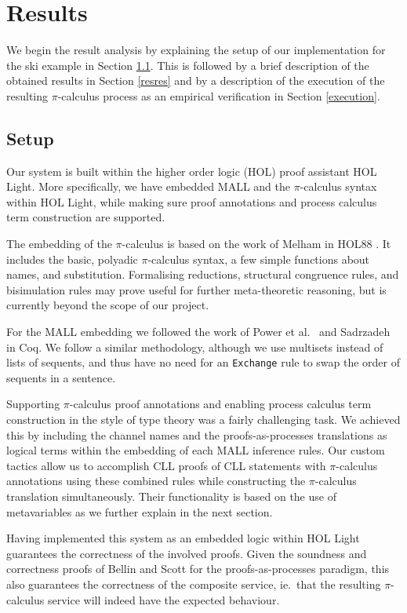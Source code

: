 \documentclass[copyright,creativecommons]{eptcs}
\begin{document}
\section{Results}
\label{results}

We begin the result analysis by explaining the setup of our implementation for the ski example in Section \ref{setup}. This is followed by a brief description of the obtained results in Section \ref{resres} and by a description of the execution of the resulting $\pi$-calculus process as an empirical verification in Section \ref{execution}.

\subsection{Setup}
\label{setup}

Our system is built within the higher order logic (HOL) proof assistant HOL Light. More specifically, we have embedded MALL and the $\pi$-calculus syntax within HOL Light, while making sure proof annotations and process calculus term construction are supported.

The embedding of the $\pi$-calculus is based on the work of Melham in HOL88 \cite{melham1994mechanized}. It includes the basic, polyadic $\pi$-calculus syntax, a few simple functions about names, and substitution. Formalising reductions, structural congruence rules, and bisimulation rules may prove useful for further meta-theoretic reasoning, but is currently beyond the scope of our project.

For the MALL embedding we followed the work of Power et al.\ \cite{power1999working} and Sadrzadeh \cite{sadrzadeh2003modal} in Coq. We follow a similar methodology, although we use multisets instead of lists of sequents, and thus have no need for an \texttt{Exchange} rule to swap the order of sequents in a sentence. 

Supporting $\pi$-calculus proof annotations and enabling process calculus term construction in the style of type theory was a fairly challenging task. We achieved this by including the channel names and the proofs-as-processes translations as logical terms within the embedding of each MALL inference rules. Our custom tactics allow us to accomplish CLL proofs of CLL statements with $\pi$-calculus annotations using these combined rules while constructing the $\pi$-calculus translation simultaneously. Their functionality is based on the use of metavariables as we further explain in the next section.

Having implemented this system as an embedded logic within HOL Light guarantees the correctness of the involved proofs. Given the soundness and correctness proofs of Bellin and Scott for the proofs-as-processes paradigm, this also guarantees the correctness of the composite service, ie.\ that the resulting $\pi$-calculus service will indeed have the expected behaviour. 
\end{document}
